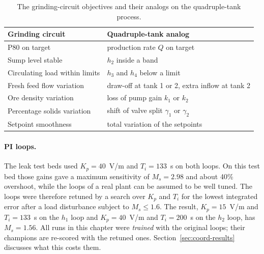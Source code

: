 \begin{table}[tb]
  \centering
  \caption{The grinding-circuit objectives and their analogs on the
    quadruple-tank process.}
  \label{tab:coord-analog}
  \begin{tabular}{@{}ll@{}}
    \toprule
    Grinding circuit & Quadruple-tank analog \\
    \midrule
    P80 on target                  & production rate $Q$ on target \\
    Sump level stable              & $h_2$ inside a band \\
    Circulating load within limits & $h_3$ and $h_4$ below a limit \\
    Fresh feed flow variation      & draw-off at tank 1 or 2, extra inflow at tank 2 \\
    Ore density variation          & loss of pump gain $k_1$ or $k_2$ \\
    Percentage solids variation    & shift of valve split $\gamma_1$ or $\gamma_2$ \\
    Setpoint smoothness            & total variation of the setpoints \\
    \bottomrule
  \end{tabular}
\end{table}

\paragraph{PI loops.} The leak test beds used $K_p = 40$~V/m and
$T_i = 133$~s on both loops. On this test bed those gains gave a maximum
sensitivity of $M_s = 2.98$ and about 40\% overshoot, while the loops of a
real plant can be assumed to be well tuned. The loops were therefore retuned
by a search over $K_p$ and $T_i$ for the lowest integrated error after a load
disturbance subject to $M_s \le 1.6$. The result, $K_p = 15$~V/m and
$T_i = 133$~s on the $h_1$ loop and $K_p = 40$~V/m and $T_i = 200$~s on the
$h_2$ loop, has $M_s = 1.56$. All runs in this chapter were \emph{trained}
with the original loops; their champions are re-scored with the retuned
ones. Section~\ref{sec:coord-results} discusses what this costs them.

